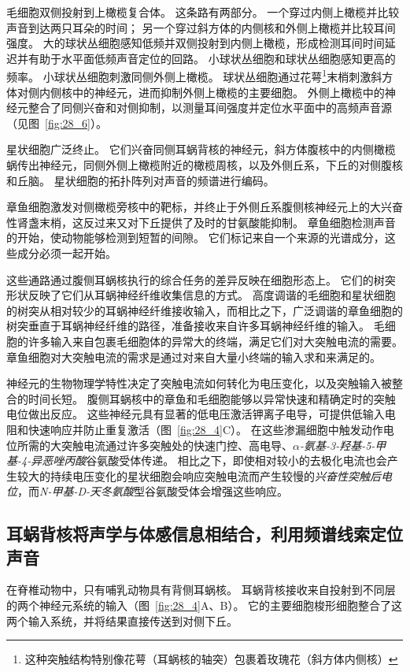 毛细胞双侧投射到上橄榄复合体。
这条路有两部分。
一个穿过内侧上橄榄并比较声音到达两只耳朵的时间； 另一个穿过斜方体的内侧核和外侧上橄榄并比较耳间强度。
大的球状丛细胞感知低频并双侧投射到内侧上橄榄，形成检测耳间时间延迟并有助于水平面低频声音定位的回路。
小球状丛细胞和球状丛细胞感知更高的频率。
小球状丛细胞刺激同侧外侧上橄榄。
球状丛细胞通过花萼\footnote{这种突触结构特别像花萼（耳蜗核的轴突）包裹着玫瑰花（斜方体内侧核）}末梢刺激斜方体对侧内侧核中的神经元，进而抑制外侧上橄榄的主要细胞。
外侧上橄榄中的神经元整合了同侧兴奋和对侧抑制，以测量耳间强度并定位水平面中的高频声音源（见图~\ref{fig:28_6}）。


星状细胞广泛终止。
它们兴奋同侧耳蜗背核的神经元，斜方体腹核中的内侧橄榄蜗传出神经元，同侧外侧上橄榄附近的橄榄周核，以及外侧丘系，下丘的对侧腹核和丘脑。 
星状细胞的拓扑阵列对声音的频谱进行编码。


章鱼细胞激发对侧橄榄旁核中的靶标，并终止于外侧丘系腹侧核神经元上的大兴奋性肾盏末梢，这反过来又对下丘提供了及时的甘氨酸能抑制。
章鱼细胞检测声音的开始，使动物能够检测到短暂的间隙。
它们标记来自一个来源的光谱成分，这些成分必须一起开始。


这些通路通过腹侧耳蜗核执行的综合任务的差异反映在细胞形态上。
它们的树突形状反映了它们从耳蜗神经纤维收集信息的方式。
高度调谐的毛细胞和星状细胞的树突从相对较少的耳蜗神经纤维接收输入，而相比之下，广泛调谐的章鱼细胞的树突垂直于耳蜗神经纤维的路径，准备接收来自许多耳蜗神经纤维的输入。
毛细胞的许多输入来自包裹毛细胞体的异常大的终端，满足它们对大突触电流的需要。
章鱼细胞对大突触电流的需求是通过对来自大量小终端的输入求和来满足的。


神经元的生物物理学特性决定了突触电流如何转化为电压变化，以及突触输入被整合的时间长短。
腹侧耳蜗核中的章鱼和毛细胞能够以异常快速和精确定时的突触电位做出反应。
这些神经元具有显著的低电压激活钾离子电导，可提供低输入电阻和快速响应并防止重复激活（图~\ref{fig:28_4}C）。
在这些渗漏细胞中触发动作电位所需的大突触电流通过许多突触处的快速门控、高电导、\textit{$\alpha$-氨基-3-羟基-5-甲基-4-异恶唑丙酸}谷氨酸受体传递。
相比之下，即使相对较小的去极化电流也会产生较大的持续电压变化的星状细胞会响应突触电流而产生较慢的\textit{兴奋性突触后电位}，而\textit{N-甲基-D-天冬氨酸}型谷氨酸受体会增强这些响应。



\subsection{耳蜗背核将声学与体感信息相结合，利用频谱线索定位声音}

在脊椎动物中，只有哺乳动物具有背侧耳蜗核。
耳蜗背核接收来自投射到不同层的两个神经元系统的输入（图~\ref{fig:28_4}A、B）。
它的主要细胞梭形细胞整合了这两个输入系统，并将结果直接传送到对侧下丘。


